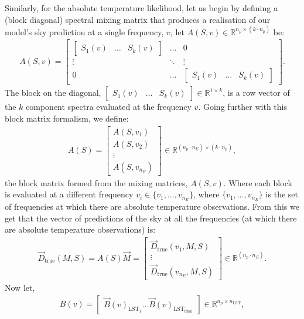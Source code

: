 \documentclass[fleqn,usenatbib]{mnras}
\begin{document}
Similarly, for the absolute temperature likelihood, let us begin by defining a (block diagonal) spectral mixing matrix that produces a realisation of our model's sky prediction at a single frequency, $v$, let $A(S,v) \in \mathbb{R}^{n_p\times(k\cdot n_p)}$ be:
\begin{align}
    A(S,v) = \begin{bmatrix} \begin{bmatrix}S_1(v) & \ldots &S_k(v)\end{bmatrix} & \ldots &0 \\ \vdots &\ddots &\vdots \\ 0 &\ldots & \begin{bmatrix}S_1(v) & \ldots &S_k(v)\end{bmatrix} \end{bmatrix}.
\end{align}
The block on the diagonal, $\begin{bmatrix}S_1(v) & \ldots &S_k(v)\end{bmatrix} \in \mathbb{R}^{1\times k}$, is a row vector of the $k$ component spectra evaluated at the frequency $v$. Going further with this block matrix formalism, we define:
\begin{align}
    A(S) = \begin{bmatrix} A(S,v_1) \\ A(S,v_2) \\ \vdots \\ A(S,v_{n_E})\end{bmatrix} \in \mathbb{R}^{(n_p\cdot n_E) \times (k\cdot n_p)},
\end{align}
the block matrix formed from the mixing matrices, $A(S,v)$. Where each block is evaluated at a different frequency $v_i\in\{v_1,\ldots,v_{n_E}\}$, where $\{v_1,\ldots,v_{n_E}\}$ is the set of frequencies at which there are absolute temperature observations. From this we get that the vector of predictions of the sky at all the frequencies (at which there are absolute temperature observations) is:
\begin{align}
    \Vec{D}_\mathrm{true}(M,S) = A(S) \Vec{M} = \begin{bmatrix} \Vec{D}_\mathrm{true}(v_1,M,S) \\ \vdots \\ \Vec{D}_\mathrm{true}(v_{n_E},M,S)\end{bmatrix} \in \mathbb{R}^{(n_p \cdot n_E)}.
\end{align}
Now let,
\begin{align}
    B(v) = \begin{bmatrix} \Vec{B}(v)_{\mathrm{LST_1}} \ldots \Vec{B}(v)_{\mathrm{LST_{final}}}\end{bmatrix} \in \mathbb{R}^{n_p\times n_\mathrm{LST}},
\end{align}
\end{document}
